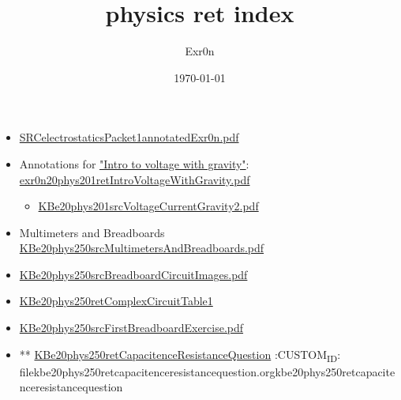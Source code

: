 \documentclass[letterpaper]{article}
\author{Exr0n}
\date{\today}
\title{physics ret index}
\renewcommand{\tableofcontents}{}
\begin{document}
\tableofcontents

\begin{itemize}
\item \href{SRCelectrostaticsPacket1annotatedExr0n.pdf.org}{SRCelectrostaticsPacket1annotatedExr0n.pdf}

\item Annotations for
\href{https://nuevaschool.instructure.com/courses/2851/assignments/51288}{"Intro
to voltage with gravity"}:
\href{exr0n20phys201retIntroVoltageWithGravity.pdf.org}{exr0n20phys201retIntroVoltageWithGravity.pdf}

\begin{itemize}
\item \href{KBe20phys201srcVoltageCurrentGravity2.pdf.org}{KBe20phys201srcVoltageCurrentGravity2.pdf}
\end{itemize}

\item Multimeters and Breadboards
\href{KBe20phys250srcMultimetersAndBreadboards.pdf.org}{KBe20phys250srcMultimetersAndBreadboards.pdf}

\item \href{KBe20phys250srcBreadboardCircuitImages.pdf.org}{KBe20phys250srcBreadboardCircuitImages.pdf}

\item \href{KBe20phys250retComplexCircuitTable1.org}{KBe20phys250retComplexCircuitTable1}

\item \href{KBe20phys250srcFirstBreadboardExercise.pdf.org}{KBe20phys250srcFirstBreadboardExercise.pdf}

\item ** \href{KBe20phys250retCapacitenceResistanceQuestion.org}{KBe20phys250retCapacitenceResistanceQuestion}
:CUSTOM\textsubscript{ID}: filekbe20phys250retcapacitenceresistancequestion.orgkbe20phys250retcapacitenceresistancequestion
\end{itemize}
\end{document}
